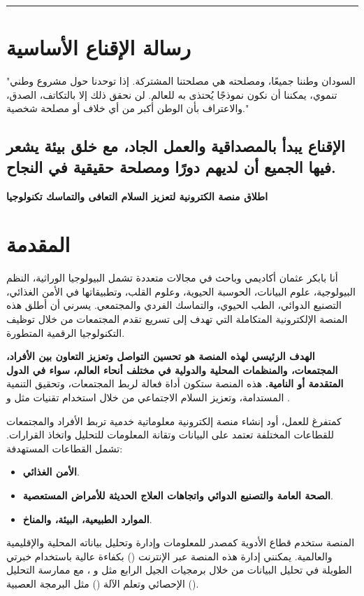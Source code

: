 \documentclass[12pt]{article}
\begin{document}
\hrule

\section{رسالة الإقناع الأساسية}
"السودان وطننا جميعًا، ومصلحته هي مصلحتنا المشتركة. إذا توحدنا حول مشروع وطني تنموي، يمكننا أن نكون نموذجًا يُحتذى به للعالم. لن نحقق ذلك إلا بالتكاتف، الصدق، والاعتراف بأن الوطن أكبر من أي خلاف أو مصلحة شخصية."

\subsection{الإقناع يبدأ بالمصداقية والعمل الجاد، مع خلق بيئة يشعر فيها الجميع أن لديهم دورًا ومصلحة حقيقية في النجاح.}




\newpage  


\begin{center}                       {\Huge\textbf{\textcolor{titleColor}{ اطلاق منصة الكترونية لتعزيز السلام التعافى والتماسك تكنولوجيا }}}         
\end{center}
	\vspace{0.5cm}


\section {\textcolor{sectionColor}{المقدمة}}
أنا بابكر عثمان أكاديمي وباحث في مجالات متعددة تشمل البيولوجيا الوراثية، النظم البيولوجية، علوم البيانات، الحوسبة الحيوية، وعلوم القلب، وتطبيقاتها في الأمن الغذائي، التصنيع الدوائي، الطب الحيوي، والتماسك الفردي والمجتمعي. يسرني أن أطلق هذه المنصة الإلكترونية المتكاملة التي تهدف إلى تسريع تقدم المجتمعات من خلال توظيف التكنولوجيا الرقمية المتطورة.

\textbf{الهدف الرئيسي لهذه المنصة هو تحسين التواصل وتعزيز التعاون بين الأفراد، المجتمعات، والمنظمات المحلية والدولية في مختلف أنحاء العالم، سواء في الدول المتقدمة أو النامية.} هذه المنصة ستكون أداة فعالة لربط المجتمعات، وتحقيق التنمية المستدامة، وتعزيز السلام الاجتماعي من خلال استخدام تقنيات مثل  و .

كمتفرغ للعمل، أود إنشاء منصة إلكترونية معلوماتية خدمية تربط الأفراد والمجتمعات للقطاعات المختلفة تعتمد على البيانات وتقانة المعلومات للتحليل واتخاذ القرارات.
تشمل القطاعات المستهدفة:
\begin{itemize}
    \item \textbf{الأمن الغذائي}.
    \item \textbf{الصحة العامة والتصنيع الدوائي واتجاهات العلاج الحديثة للأمراض المستعصية}.
    \item \textbf{الموارد الطبيعية، البيئة، والمناخ}.
\end{itemize}
المنصة ستخدم قطاع الأدوية كمصدر للمعلومات وإدارة وتحليل بياناته المحلية والإقليمية والعالمية. يمكنني إدارة هذه المنصة عبر الإنترنت () بكفاءة عالية باستخدام خبرتي الطويلة في تحليل البيانات من خلال برمجيات الجيل الرابع مثل  و ، مع ممارسة التحليل الإحصائي وتعلم الآلة () مثل البرمجة العصبية ().
\end{document}
